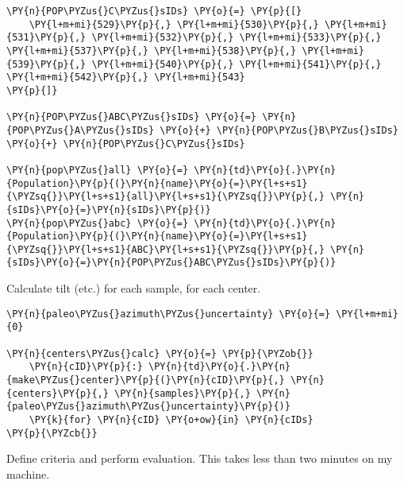 \begin{tcolorbox}[breakable, size=fbox, boxrule=1pt, pad at break*=1mm,colback=cellbackground, colframe=cellborder]
\begin{Verbatim}[commandchars=\\\{\}]
\PY{n}{POP\PYZus{}C\PYZus{}sIDs} \PY{o}{=} \PY{p}{[}
    \PY{l+m+mi}{529}\PY{p}{,} \PY{l+m+mi}{530}\PY{p}{,} \PY{l+m+mi}{531}\PY{p}{,} \PY{l+m+mi}{532}\PY{p}{,} \PY{l+m+mi}{533}\PY{p}{,} \PY{l+m+mi}{537}\PY{p}{,} \PY{l+m+mi}{538}\PY{p}{,} \PY{l+m+mi}{539}\PY{p}{,} \PY{l+m+mi}{540}\PY{p}{,} \PY{l+m+mi}{541}\PY{p}{,} \PY{l+m+mi}{542}\PY{p}{,} \PY{l+m+mi}{543}
\PY{p}{]}

\PY{n}{POP\PYZus{}ABC\PYZus{}sIDs} \PY{o}{=} \PY{n}{POP\PYZus{}A\PYZus{}sIDs} \PY{o}{+} \PY{n}{POP\PYZus{}B\PYZus{}sIDs} \PY{o}{+} \PY{n}{POP\PYZus{}C\PYZus{}sIDs}

\PY{n}{pop\PYZus{}all} \PY{o}{=} \PY{n}{td}\PY{o}{.}\PY{n}{Population}\PY{p}{(}\PY{n}{name}\PY{o}{=}\PY{l+s+s1}{\PYZsq{}}\PY{l+s+s1}{all}\PY{l+s+s1}{\PYZsq{}}\PY{p}{,} \PY{n}{sIDs}\PY{o}{=}\PY{n}{sIDs}\PY{p}{)}
\PY{n}{pop\PYZus{}abc} \PY{o}{=} \PY{n}{td}\PY{o}{.}\PY{n}{Population}\PY{p}{(}\PY{n}{name}\PY{o}{=}\PY{l+s+s1}{\PYZsq{}}\PY{l+s+s1}{ABC}\PY{l+s+s1}{\PYZsq{}}\PY{p}{,} \PY{n}{sIDs}\PY{o}{=}\PY{n}{POP\PYZus{}ABC\PYZus{}sIDs}\PY{p}{)}
\end{Verbatim}
\end{tcolorbox}

    Calculate tilt (etc.) for each sample, for each center.

    \begin{tcolorbox}[breakable, size=fbox, boxrule=1pt, pad at break*=1mm,colback=cellbackground, colframe=cellborder]
\begin{Verbatim}[commandchars=\\\{\}]
\PY{n}{paleo\PYZus{}azimuth\PYZus{}uncertainty} \PY{o}{=} \PY{l+m+mi}{0}

\PY{n}{centers\PYZus{}calc} \PY{o}{=} \PY{p}{\PYZob{}}
    \PY{n}{cID}\PY{p}{:} \PY{n}{td}\PY{o}{.}\PY{n}{make\PYZus{}center}\PY{p}{(}\PY{n}{cID}\PY{p}{,} \PY{n}{centers}\PY{p}{,} \PY{n}{samples}\PY{p}{,} \PY{n}{paleo\PYZus{}azimuth\PYZus{}uncertainty}\PY{p}{)}
    \PY{k}{for} \PY{n}{cID} \PY{o+ow}{in} \PY{n}{cIDs}
\PY{p}{\PYZcb{}}
\end{Verbatim}
\end{tcolorbox}

    Define criteria and perform evaluation. This takes less than two minutes
on my machine.

